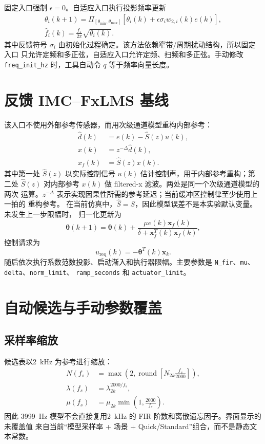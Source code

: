 \documentclass[UTF8,11pt,a4paper]{ctexart}
\begin{document}
固定入口强制 $\epsilon=0$。自适应入口执行投影频率更新
\begin{align}
\theta_i(k+1)=\Pi_{[\theta_{\min},\theta_{\max}]}
\left[\theta_i(k)+\epsilon\sigma_iw_{2,i}(k)e(k)\right],\\
\hat f_i(k)=\frac{f_s}{2\pi}\sqrt{\theta_i(k)}.
\end{align}
其中反馈符号 $\sigma_i$ 由初始化过程确定。该方法依赖窄带/周期扰动结构，所以固定入口
只允许定频和多正弦，自适应入口允许定频、扫频和多正弦。手动修改
\texttt{freq\_init\_hz} 时，工具自动令 $q$ 等于频率向量长度。

\section{反馈 IMC--FxLMS 基线}

该入口不使用外部参考传感器，而用次级通道模型重构内部参考：
\begin{align}
\hat d(k)&=e(k)-\hat S(z)u(k),\\
x(k)&=z^{-\Delta}\hat d(k),\\
x_f(k)&=\hat S(z)x(k).
\end{align}
其中第一处 $\hat S(z)$ 以实际控制信号 $u(k)$ 估计控制声，用于内部参考重构；第二处
$\hat S(z)$ 对内部参考 $x(k)$ 做 filtered-x 滤波。两处是同一个次级通道模型的两次
运算。$z^{-\Delta}$ 表示实现因果性所需的参考延迟；当前缓冲区控制律至少使用上一拍的
重构参考。
在当前仿真中，$\hat S=S$，因此模型误差不是本实验默认变量。未发生上一步限幅时，
归一化更新为
\begin{equation}
\bm\theta(k+1)=\bm\theta(k)+
\frac{\mu e(k)\bm x_f(k)}{\delta+\bm x_f^T(k)\bm x_f(k)},
\end{equation}
控制请求为
\begin{equation}
u_{\mathrm{req}}(k)=-\bm\theta^T(k)\bm x_k.
\end{equation}
随后依次执行系数范数投影、启动渐入和执行器限幅。主要参数是
\texttt{N\_fir}、\texttt{mu}、\texttt{delta}、\texttt{norm\_limit}、
\texttt{ramp\_seconds} 和 \texttt{actuator\_limit}。

\section{自动候选与手动参数覆盖}

\subsection{采样率缩放}

候选表以2~kHz 为参考进行缩放：
\begin{align}
N(f_s)&=\max\!\left(2,\operatorname{round}\left[N_{2k}\frac{f_s}{2000}\right]\right),\\
\lambda(f_s)&=\lambda_{2k}^{2000/f_s},\\
\mu(f_s)&=\mu_{2k}\min\left(1,\frac{2000}{f_s}\right).
\end{align}
因此 3999~Hz 模型不会直接复用2~kHz 的 FIR 阶数和离散遗忘因子。界面显示的未覆盖值
来自当前“模型采样率 + 场景 + Quick/Standard”组合，而不是静态文本常数。
\end{document}
